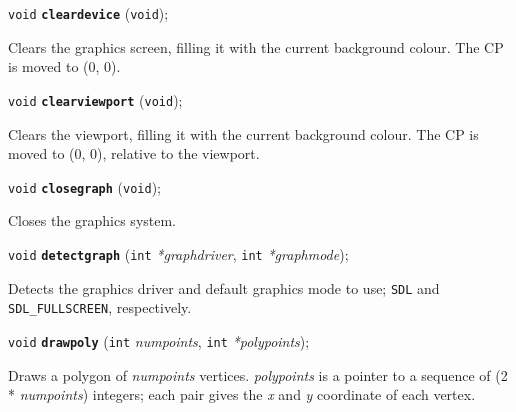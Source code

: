 \documentclass[a4paper,12pt]{article}
\newcommand{\V}{\texttt{void}}      %
\newcommand{\I}{\texttt{int}}       %
\newcommand{\func}[1]{\textbf{\texttt{#1}}}  %
\newcommand{\A}[1]{\emph{#1}}       %
\newcommand{\T}[1]{\texttt{#1}}     %
\newenvironment{bgi}
{ %
  \begin{snugshade}
}
{ %
  \end{snugshade}
}
\begin{document}
\begin{bgi}
\V{} \func{cleardevice} (\V{});
\end{bgi}

Clears the graphics screen, filling it with the current background
colour. The CP is moved to (0, 0).


\label{sec:clearviewport}

\begin{bgi}
\V{} \func{clearviewport} (\V{});
\end{bgi}

Clears the viewport, filling it with the current background colour.
The CP is moved to (0, 0), relative to the viewport.


\label{sec:closegraph}

\begin{bgi}
\V{} \func{closegraph} (\V{});
\end{bgi}

Closes the graphics system.


\label{sec:detectgraph}

\begin{bgi}
\V{} \func{detectgraph} (\I{} \A{*graphdriver}, \I{} \A{*graphmode});
\end{bgi}

Detects the graphics driver and default graphics mode to use; \T{SDL}
and \T{SDL\_FULL\-SCREEN}, respectively.


\label{sec:drawpoly}

\begin{bgi}
\V{} \func{drawpoly} (\I{} \A{numpoints}, \I{} \A{*polypoints});
\end{bgi}

Draws a polygon of \A{numpoints} vertices. \A{polypoints} is a
pointer to a sequence of (2 * \A{numpoints}) integers; each pair gives
the \A{x} and \A{y} coordinate of each vertex.


\label{sec:ellipse}
\end{document}
